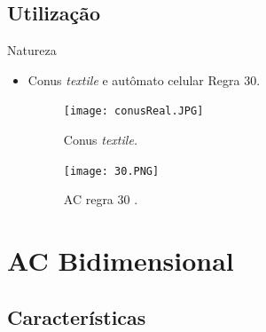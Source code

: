 \documentclass[compress, hide notes]{beamer}
\begin{document}
\subsection{Utilização}

\begin{frame}{Natureza \cite{ufmg}}
	
	\begin{itemize}
		
		\item Conus \textit{textile} e autômato celular Regra 30.
		
			\begin{minipage}[t]{0.45\linewidth}\centering
				
				\begin{figure}[!htb]
			
					\texttt{[image: conusReal.JPG]}
					\label{conusReal}
					\caption{Conus \textit{textile.}}
				
				\end{figure}
					
				\end{minipage}\hfill
			\begin{minipage}[t]{0.45\linewidth}\centering
					
				\begin{figure}[!htb]
			
					\texttt{[image: 30.PNG]}
					\label{regra30}
					\caption{AC regra 30 \cite{ufmg}.}
				
				\end{figure}
					
			\end{minipage}
		
	\end{itemize}
	
\end{frame}

\section{AC Bidimensional}

\subsection{Características}
\end{document}
